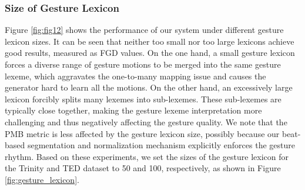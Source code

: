 \subsubsection{Size of Gesture Lexicon}
Figure \ref{fig:fig12} shows the performance of our system under different gesture lexicon sizes. It can be seen that neither too small nor too large lexicons achieve good results, measured as FGD values. On the one hand, a small gesture lexicon forces a diverse range of gesture motions to be merged into the same gesture lexeme, which aggravates the one-to-many mapping issue and causes the generator hard to learn all the motions. On the other hand, an excessively large lexicon forcibly splits many lexemes into sub-lexemes. These sub-lexemes are typically close together, making the gesture lexeme interpretation more challenging and thus negatively affecting the gesture quality. We note that the PMB metric is less affected by the gesture lexicon size, possibly because our beat-based segmentation and normalization mechanism explicitly enforces the gesture rhythm. Based on these experiments, we set the sizes of the gesture lexicon for the Trinity and TED dataset to 50 and 100, respectively, as shown in Figure \ref{fig:gesture_lexicon}.

